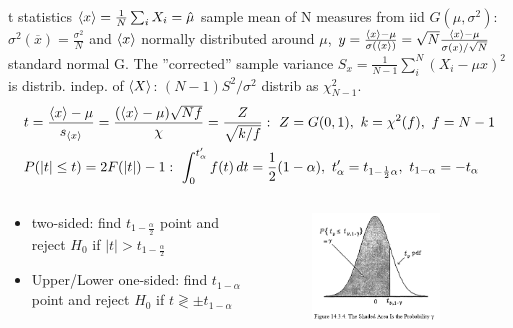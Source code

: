 \documentclass[asd-beamer.tex]{subfiles}%
\begin{document}
\begin{frame}{t statistics}
$\langle x \rangle=\frac{1}{N}\sum_iX_i=\hat{\mu}$ sample mean of N measures from iid $G(\mu,\sigma^2)$: $\sigma^2(\overline{x})=\frac{\sigma^2}{N}$ and $\langle x \rangle$ normally distributed around $\mu$, $y=\frac{\langle x \rangle-\mu}{\sigma(\langle x \rangle)}=\sqrt{N}\frac{\langle x \rangle-\mu}{\sigma(x)/\sqrt{N}}$ standard normal G. The ''corrected'' sample variance $S_x=\frac{1}{N-1}\sum_i^N(X_i-\mu{x})^2$ is distrib. indep. of $\langle X \rangle$: $(N-1)S^2/\sigma^2$ distrib as $\chi^2_{N-1}$.
\begin{align*}
&t=\frac{\exv{x}-\mu}{s_{\exv{x}}}=\frac{(\exv{x}-\mu)\sqrt{Nf}}{\chi}=\frac{Z}{\sqrt{k/f}}:\ Z=G(0,1),\ k=\chi^2(f),\ f=N-1\\
&P(|t|\leq t)=2F(|t|)-1:\ \int_0^{t_{\alpha}'}f(t)\,dt=\frac{1}{2}(1-\alpha),\ t_{\alpha}'=t_{1-\frac{1}{2}\alpha},\ t_{1-\alpha}=-t_{\alpha}
\end{align*}
\begin{columns}[T]
\begin{column}{0.6\textwidth}
\begin{itemize}
	\item two-sided: find $t_{1-\frac{\alpha}{2}}$ point and reject $H_0$ if $|t|>t_{1-\frac{\alpha}{2}}$
	\item Upper/Lower one-sided: find $t_{1-\alpha}$ point and reject $H_0$ if $t\gtrless \pm t_{1-\alpha}$
\end{itemize}
\end{column}
\begin{column}{0.4\textwidth}
	\begin{figure}[!ht]\includegraphics[trim={0cm 0cm 0 0},clip, keepaspectratio,width=0.8\textwidth]{figures/mukhopadhyay/tests/studenttpercpoint}\label{fig:studenttpercpoint}
	\end{figure}
\end{column}
\end{columns}
\end{frame}
\end{document}
